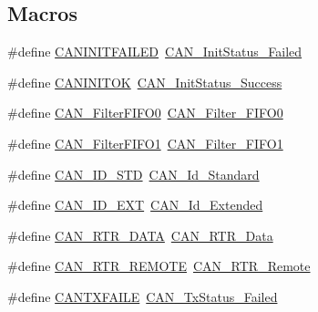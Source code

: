 \subsection*{Macros}
\begin{DoxyCompactItemize}
\item 
\#define \hyperlink{group___c_a_n___legacy_ga0539a9e5a898fcd71c4dcb7e341e4b86}{C\+A\+N\+I\+N\+I\+T\+F\+A\+I\+L\+ED}~\hyperlink{group___c_a_n__sleep__constants_ga095c319e8c54c974eb2b6eeadf180d96}{C\+A\+N\+\_\+\+Init\+Status\+\_\+\+Failed}
\item 
\#define \hyperlink{group___c_a_n___legacy_ga14cba0b5b506be73e2f45c732f8e54cb}{C\+A\+N\+I\+N\+I\+T\+OK}~\hyperlink{group___c_a_n__sleep__constants_ga6bed5957af8f2f6b00568e15ccac5772}{C\+A\+N\+\_\+\+Init\+Status\+\_\+\+Success}
\item 
\#define \hyperlink{group___c_a_n___legacy_ga1b3d041dff9fed4dad75ed2a4a0e27e0}{C\+A\+N\+\_\+\+Filter\+F\+I\+F\+O0}~\hyperlink{group___c_a_n__filter___f_i_f_o_ga8249c27978ca94676530540b88a6be8f}{C\+A\+N\+\_\+\+Filter\+\_\+\+F\+I\+F\+O0}
\item 
\#define \hyperlink{group___c_a_n___legacy_gada8f9b3a9c88f36539aaeb457039e666}{C\+A\+N\+\_\+\+Filter\+F\+I\+F\+O1}~\hyperlink{group___c_a_n__filter___f_i_f_o_gaab8478c89a607c4b8baf68efc730e316}{C\+A\+N\+\_\+\+Filter\+\_\+\+F\+I\+F\+O1}
\item 
\#define \hyperlink{group___c_a_n___legacy_ga284ca16658deb9d0c21f4ddc6db14833}{C\+A\+N\+\_\+\+I\+D\+\_\+\+S\+TD}~\hyperlink{group___c_a_n__identifier__type_ga151d9df8a6f361d0a3231593726b5a13}{C\+A\+N\+\_\+\+Id\+\_\+\+Standard}
\item 
\#define \hyperlink{group___c_a_n___legacy_ga5f6fdd1dc3d312af1ac30e2eee15d6f0}{C\+A\+N\+\_\+\+I\+D\+\_\+\+E\+XT}~\hyperlink{group___c_a_n__identifier__type_gaf6c5c0b43b968fed17fd90246912b1a7}{C\+A\+N\+\_\+\+Id\+\_\+\+Extended}
\item 
\#define \hyperlink{group___c_a_n___legacy_gab1e89074b4fcfebf81c323909625b0d0}{C\+A\+N\+\_\+\+R\+T\+R\+\_\+\+D\+A\+TA}~\hyperlink{group___c_a_n__remote__transmission__request_ga2407c3a8b2cd97bd651143aa959219f1}{C\+A\+N\+\_\+\+R\+T\+R\+\_\+\+Data}
\item 
\#define \hyperlink{group___c_a_n___legacy_gab15c649e3e497c6d1145bb98ff7f3f04}{C\+A\+N\+\_\+\+R\+T\+R\+\_\+\+R\+E\+M\+O\+TE}~\hyperlink{group___c_a_n__remote__transmission__request_ga42e95ddfb02d88c82de84058fb0fb349}{C\+A\+N\+\_\+\+R\+T\+R\+\_\+\+Remote}
\item 
\#define \hyperlink{group___c_a_n___legacy_gae315f7ee14af20ca8454be9e507873cd}{C\+A\+N\+T\+X\+F\+A\+I\+LE}~\hyperlink{group___c_a_n__transmit__constants_ga8d193002e76c04ec8caff6b110cd5983}{C\+A\+N\+\_\+\+Tx\+Status\+\_\+\+Failed}

\end{DoxyCompactItemize}

